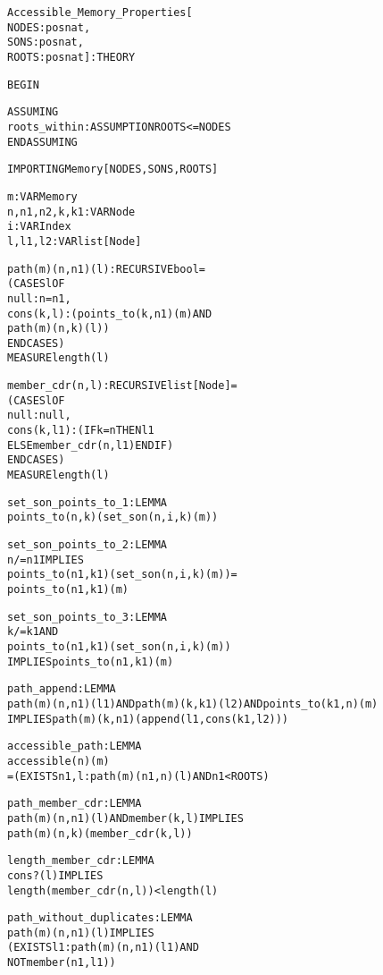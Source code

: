 \newpage
\begin{alltt}
%%%%%%%%%%%%%%%%%%%%%%%%%%%%%%%%%%%%%%%%%%%%%%%%%%%%%%
% Accessible_Memory_Properties :                     %  
%   States lemmas about the ``accessible'' function. %
%   These lemmas are needed during invariant proofs. %
%%%%%%%%%%%%%%%%%%%%%%%%%%%%%%%%%%%%%%%%%%%%%%%%%%%%%%

Accessible_Memory_Properties[
  NODES : posnat, 
  SONS  : posnat, 
  ROOTS : posnat] : THEORY

BEGIN

  ASSUMING
    roots_within : ASSUMPTION ROOTS <= NODES
  ENDASSUMING

  IMPORTING Memory[NODES,SONS,ROOTS]

  m : VAR Memory
  n,n1,n2,k,k1 : VAR Node
  i : VAR Index
  l,l1,l2 : VAR list[Node]

  path(m)(n, n1)(l): RECURSIVE bool =
    (CASES l OF
       null: n = n1,
       cons(k,l): (points_to(k, n1)(m) AND
                   path(m)(n, k)(l))
     ENDCASES)
     MEASURE length(l)

  member_cdr(n, l): RECURSIVE list[Node] =
     (CASES l OF
        null: null,
        cons(k, l1): (IF k = n THEN l1
                        ELSE member_cdr(n, l1) ENDIF)
      ENDCASES)
      MEASURE length(l)

  set_son_points_to_1: LEMMA
      points_to(n, k)(set_son(n, i, k)(m))

  set_son_points_to_2: LEMMA
      n /= n1 IMPLIES
        points_to(n1, k1)(set_son(n, i, k)(m)) =
        points_to(n1, k1)(m)

  set_son_points_to_3: LEMMA
      k/=k1 AND 
      points_to(n1, k1)(set_son(n, i, k)(m)) 
      IMPLIES  points_to(n1, k1)(m)
         
  path_append: LEMMA
     path(m)(n, n1)(l1) AND path(m)(k, k1)(l2) AND points_to(k1, n)(m)
       IMPLIES path(m)(k, n1)(append(l1, cons(k1, l2)))

  accessible_path: LEMMA
    accessible(n)(m)
      = (EXISTS n1, l: path(m)(n1, n)(l) AND n1 < ROOTS)

  path_member_cdr: LEMMA
    path(m)(n, n1)(l) AND member(k, l) IMPLIES
      path(m)(n, k)(member_cdr(k, l))

  length_member_cdr: LEMMA
    cons?(l) IMPLIES
      length(member_cdr(n, l)) < length(l)

  path_without_duplicates: LEMMA
    path(m)(n, n1)(l) IMPLIES
      (EXISTS l1: path(m)(n, n1)(l1) AND
                   NOT member(n1, l1))


\end{alltt}
